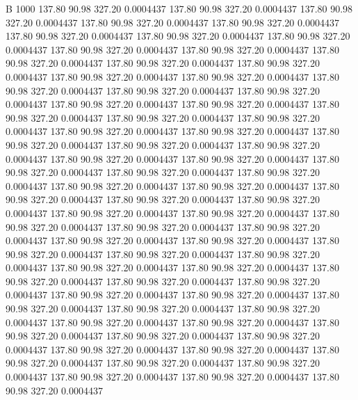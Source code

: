 


B 1000
 137.80   90.98  327.20   0.0004437
 137.80   90.98  327.20   0.0004437
 137.80   90.98  327.20   0.0004437
 137.80   90.98  327.20   0.0004437
 137.80   90.98  327.20   0.0004437
 137.80   90.98  327.20   0.0004437
 137.80   90.98  327.20   0.0004437
 137.80   90.98  327.20   0.0004437
 137.80   90.98  327.20   0.0004437
 137.80   90.98  327.20   0.0004437
 137.80   90.98  327.20   0.0004437
 137.80   90.98  327.20   0.0004437
 137.80   90.98  327.20   0.0004437
 137.80   90.98  327.20   0.0004437
 137.80   90.98  327.20   0.0004437
 137.80   90.98  327.20   0.0004437
 137.80   90.98  327.20   0.0004437
 137.80   90.98  327.20   0.0004437
 137.80   90.98  327.20   0.0004437
 137.80   90.98  327.20   0.0004437
 137.80   90.98  327.20   0.0004437
 137.80   90.98  327.20   0.0004437
 137.80   90.98  327.20   0.0004437
 137.80   90.98  327.20   0.0004437
 137.80   90.98  327.20   0.0004437
 137.80   90.98  327.20   0.0004437
 137.80   90.98  327.20   0.0004437
 137.80   90.98  327.20   0.0004437
 137.80   90.98  327.20   0.0004437
 137.80   90.98  327.20   0.0004437
 137.80   90.98  327.20   0.0004437
 137.80   90.98  327.20   0.0004437
 137.80   90.98  327.20   0.0004437
 137.80   90.98  327.20   0.0004437
 137.80   90.98  327.20   0.0004437
 137.80   90.98  327.20   0.0004437
 137.80   90.98  327.20   0.0004437
 137.80   90.98  327.20   0.0004437
 137.80   90.98  327.20   0.0004437
 137.80   90.98  327.20   0.0004437
 137.80   90.98  327.20   0.0004437
 137.80   90.98  327.20   0.0004437
 137.80   90.98  327.20   0.0004437
 137.80   90.98  327.20   0.0004437
 137.80   90.98  327.20   0.0004437
 137.80   90.98  327.20   0.0004437
 137.80   90.98  327.20   0.0004437
 137.80   90.98  327.20   0.0004437
 137.80   90.98  327.20   0.0004437
 137.80   90.98  327.20   0.0004437
 137.80   90.98  327.20   0.0004437
 137.80   90.98  327.20   0.0004437
 137.80   90.98  327.20   0.0004437
 137.80   90.98  327.20   0.0004437
 137.80   90.98  327.20   0.0004437
 137.80   90.98  327.20   0.0004437
 137.80   90.98  327.20   0.0004437
 137.80   90.98  327.20   0.0004437
 137.80   90.98  327.20   0.0004437
 137.80   90.98  327.20   0.0004437
 137.80   90.98  327.20   0.0004437
 137.80   90.98  327.20   0.0004437
 137.80   90.98  327.20   0.0004437
 137.80   90.98  327.20   0.0004437
 137.80   90.98  327.20   0.0004437
 137.80   90.98  327.20   0.0004437
 137.80   90.98  327.20   0.0004437
 137.80   90.98  327.20   0.0004437
 137.80   90.98  327.20   0.0004437
 137.80   90.98  327.20   0.0004437
 137.80   90.98  327.20   0.0004437
